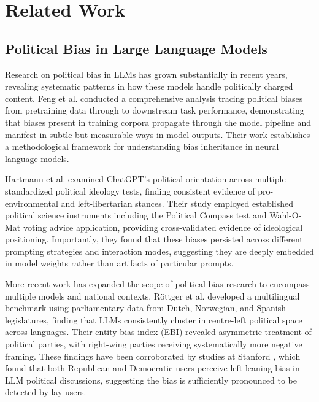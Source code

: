 \documentclass[11pt,a4paper]{article}
\begin{document}
\section{Related Work}

\subsection{Political Bias in Large Language Models}

Research on political bias in LLMs has grown substantially in recent years, revealing systematic patterns in how these models handle politically charged content. Feng et al. \citep{feng2023pretraining} conducted a comprehensive analysis tracing political biases from pretraining data through to downstream task performance, demonstrating that biases present in training corpora propagate through the model pipeline and manifest in subtle but measurable ways in model outputs. Their work establishes a methodological framework for understanding bias inheritance in neural language models.

Hartmann et al. \citep{hartmann2023political} examined ChatGPT's political orientation across multiple standardized political ideology tests, finding consistent evidence of pro-environmental and left-libertarian stances. Their study employed established political science instruments including the Political Compass test and Wahl-O-Mat voting advice application, providing cross-validated evidence of ideological positioning. Importantly, they found that these biases persisted across different prompting strategies and interaction modes, suggesting they are deeply embedded in model weights rather than artifacts of particular prompts.

More recent work has expanded the scope of political bias research to encompass multiple models and national contexts. Röttger et al. \citep{rottger2024political} developed a multilingual benchmark using parliamentary data from Dutch, Norwegian, and Spanish legislatures, finding that LLMs consistently cluster in centre-left political space across languages. Their entity bias index (EBI) revealed asymmetric treatment of political parties, with right-wing parties receiving systematically more negative framing. These findings have been corroborated by studies at Stanford \citep{stanford2024partisan}, which found that both Republican and Democratic users perceive left-leaning bias in LLM political discussions, suggesting the bias is sufficiently pronounced to be detected by lay users.
\end{document}
